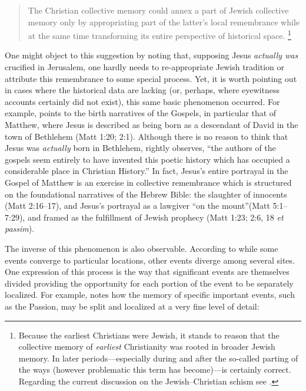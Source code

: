 \begin{quote}
The Christian collective memory could annex a part of Jewish collective memory only by appropriating part of the latter's local remembrance while at the same time transforming its entire perspective of historical space.\autocite[215]{halbwachs1992}%
%
\footnote{Because the earliest Christians were Jewish, it stands to reason that the collective memory of \emph{earliest} Christianity was rooted in broader Jewish memory. In later periods---especially during and after the so-called parting of the ways (however problematic this term has become)---\halbwachs is certainly correct. Regarding the current discussion on the Jewish--Christian schism see \cite[19--60]{burns2016}.}
\end{quote}  

One might object to this suggestion by noting that, supposing Jesus \emph{actually was} crucified in Jerusalem, one hardly needs to re-appropriate Jewish tradition or attribute this remembrance to some special process. Yet, it is worth pointing out in cases where the historical data are lacking (or, perhaps, where eyewitness accounts certainly did not exist), this same basic phenomenon occurred. For example, \halbwachs points to the birth narratives of the Gospels, in particular that of Matthew, where Jesus is described as being born as a descendant of David in the town of Bethlehem (Matt 1:20; 2:1). Although there is no reason to think that Jesus was \emph{actually} born in Bethlehem, \halbwachs rightly observes, ``the authors of the gospels seem entirely to have invented this poetic history which has occupied a considerable place in Christian History.''\autocite[214]{halbwachs1992} In fact, Jesus's entire portrayal in the Gospel of Matthew is an exercise in collective remembrance which is structured on the foundational narratives of the Hebrew Bible: the slaughter of innocents (Matt 2:16--17), and Jesus's portrayal as a lawgiver ``on the mount''(Matt 5:1--7:29), and framed as the fulfillment of Jewish prophecy (Matt 1:23; 2:6, 18 \emph{et passim}). 

The inverse of this phenomenon is also observable. According to \halbwachs while some events converge to particular locations, other events diverge among several sites. One expression of this process is the way that significant events are themselves divided providing the opportunity for each portion of the event to be separately localized. For example, \halbwachs notes how the memory of specific important events, such as the Passion, may be split and localized at a very fine level of detail:  

